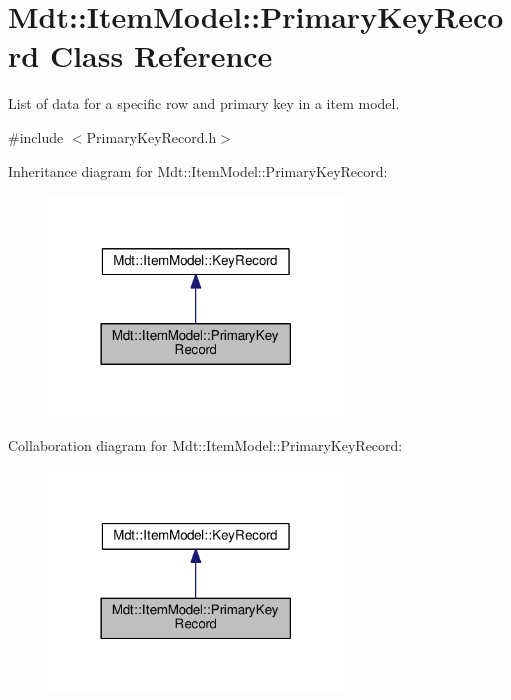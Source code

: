 \hypertarget{class_mdt_1_1_item_model_1_1_primary_key_record}{}\section{Mdt\+:\+:Item\+Model\+:\+:Primary\+Key\+Record Class Reference}
\label{class_mdt_1_1_item_model_1_1_primary_key_record}


List of data for a specific row and primary key in a item model.  




{\ttfamily \#include $<$Primary\+Key\+Record.\+h$>$}



Inheritance diagram for Mdt\+:\+:Item\+Model\+:\+:Primary\+Key\+Record\+:
\nopagebreak
\begin{figure}[H]
\begin{center}
\leavevmode
\includegraphics[width=222pt]{class_mdt_1_1_item_model_1_1_primary_key_record__inherit__graph}
\end{center}
\end{figure}


Collaboration diagram for Mdt\+:\+:Item\+Model\+:\+:Primary\+Key\+Record\+:
\nopagebreak
\begin{figure}[H]
\begin{center}
\leavevmode
\includegraphics[width=222pt]{class_mdt_1_1_item_model_1_1_primary_key_record__coll__graph}
\end{center}
\end{figure}
